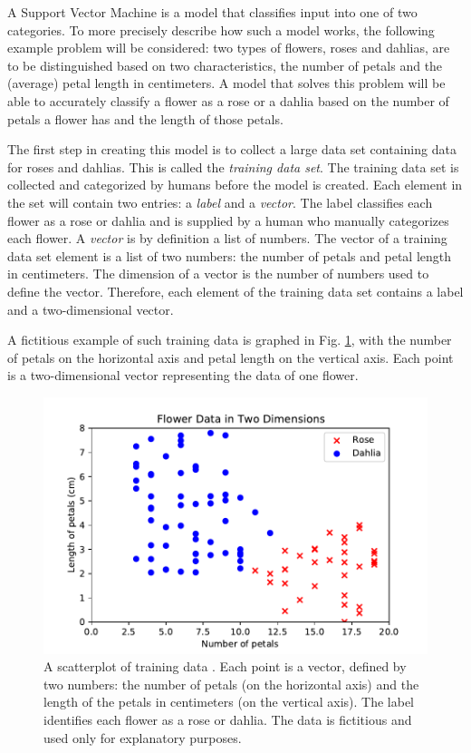 \documentclass[%
 reprint,
nofootinbib,
 amsmath,amssymb,
 aps,
]{revtex4-2}
\begin{document}
A Support Vector Machine is a model that classifies input into one of two categories. To more precisely describe how such a model works, the following example problem will be considered: two types of flowers, roses and dahlias, are to be distinguished based on two characteristics, the number of petals and the (average) petal length in centimeters. A model that solves this problem will be able to accurately classify a flower as a rose or a dahlia based on the number of petals a flower has and the length of those petals.

The first step in creating this model is to collect a large data set containing data for roses and dahlias. This is called the \textit{training data set}. The training data set is collected and categorized by humans before the model is created. Each element in the set will contain two entries: a \textit{label} and a \textit{vector}. The label classifies each flower as a rose or dahlia and is supplied by a human who manually categorizes each flower. A \textit{vector} is by definition a list of numbers. The vector of a training data set element is a list of two numbers: the number of petals and petal length in centimeters. The dimension of a vector is the number of numbers used to define the vector. Therefore, each element of the training data set contains a label and a two-dimensional vector.

A fictitious example of such training data is graphed in Fig. \ref{fig:2d_noline}, with the number of petals on the horizontal axis and petal length on the vertical axis. Each point is a two-dimensional vector representing the data of one flower.

\begin{figure}
    \includegraphics[width=\linewidth]{Figures/2d_noline.pdf}
    \caption{\label{fig:2d_noline}A scatterplot of training data \cite{noauthor_all_nodate}. Each point is a vector, defined by two numbers: the number of petals (on the horizontal axis) and the length of the petals in centimeters (on the vertical axis). The label identifies each flower as a rose or dahlia. The data is fictitious and used only for explanatory purposes.}
\end{figure}
\end{document}
